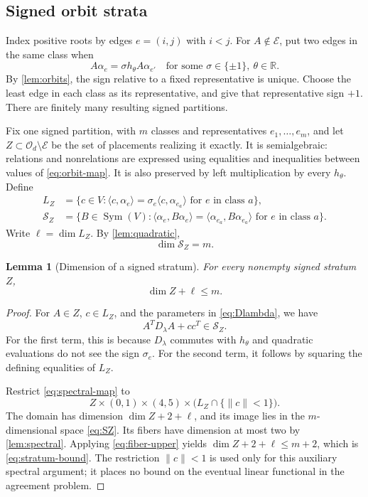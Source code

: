 \documentclass[11pt,reqno]{amsart}
\newtheorem{lemma}[lemma]{Lemma}
\theoremstyle{definition}
\theoremstyle{remark}
\numberwithin{equation}{section}
\newcommand{\R}{\mathbb R}
\newcommand{\Orth}{\mathcal O_d}
\newcommand{\Exc}{\mathcal E}
\newcommand{\ip}[2]{\langle #1,#2\rangle}
\newcommand{\norm}[1]{\lVert #1\rVert}
\DeclareMathOperator{\Sym}{Sym}
\begin{document}
\subsection{Signed orbit strata}
Index positive roots by edges $e=(i,j)$ with $i<j$.
For $A\notin\Exc$, put two edges in the same class when
\[
 A\alpha_e=\sigma h_\theta A\alpha_{e'}
 \quad\text{for some }\sigma\in\{\pm1\},\ \theta\in\R.
\]
By \cref{lem:orbits}, the sign relative to a fixed representative is
unique. Choose the least edge in each class as its representative,
and give that representative sign $+1$. There are finitely many
resulting signed partitions.

Fix one signed partition, with $m$ classes and representatives
$e_1,\ldots,e_m$, and let $Z\subset\Orth\setminus\Exc$ be the set
of placements realizing it exactly. It is semialgebraic: relations
and nonrelations are expressed using equalities and inequalities
between values of \eqref{eq:orbit-map}. It is also preserved by
left multiplication by every $h_\theta$.
Define
\begin{align}
 L_Z&=\{c\in V:\ip{c}{\alpha_e}
       =\sigma_e\ip{c}{\alpha_{e_a}}
       \text{ for }e\text{ in class }a\},
       \label{eq:LZ}\\
 \mathscr S_Z&=\{B\in\Sym(V):
       \ip{\alpha_e}{B\alpha_e}
       =\ip{\alpha_{e_a}}{B\alpha_{e_a}}
       \text{ for }e\text{ in class }a\}.
       \label{eq:SZ}
\end{align}
Write $\ell=\dim L_Z$. By \cref{lem:quadratic},
\begin{equation}\label{eq:Sdim}
 \dim\mathscr S_Z=m.
\end{equation}

\begin{lemma}[Dimension of a signed stratum]\label{lem:stratum}
For every nonempty signed stratum $Z$,
\begin{equation}\label{eq:stratum-bound}
 \dim Z+\ell\leq m.
\end{equation}
\end{lemma}
\begin{proof}
For $A\in Z$, $c\in L_Z$, and the parameters in \eqref{eq:Dlambda},
we have
\begin{equation}\label{eq:image-in-S}
 A^TD_\lambda A+cc^T\in\mathscr S_Z.
\end{equation}
For the first term, this is because $D_\lambda$ commutes with
$h_\theta$ and quadratic evaluations do not see the sign $\sigma_e$.
For the second term, it follows by squaring the defining equalities
of $L_Z$.

Restrict \eqref{eq:spectral-map} to
\[
 Z\times(0,1)\times(4,5)
       \times\bigl(L_Z\cap\{\norm c<1\}\bigr).
\]
The domain has dimension $\dim Z+2+\ell$, and its image lies in
the $m$-dimensional space \eqref{eq:SZ}. Its fibers have dimension
at most two by \cref{lem:spectral}. Applying
\eqref{eq:fiber-upper} yields
$\dim Z+2+\ell\leq m+2$, which is \eqref{eq:stratum-bound}.
The restriction $\norm c<1$ is used only for this auxiliary
spectral argument; it places no bound on the eventual linear
functional in the agreement problem.
\end{proof}
\end{document}
